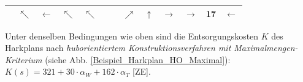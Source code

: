 \begin{center}
\begin{minipage}{\textwidth}
\begin{table}[H]
\begin{scriptsize}
\begin{tabular}{|>{}c|>{}c|>{}c|>{}c|>{}c|>{}c|>{}c|>{}c|>{}c|>{}c|>{}c|>{}c|>{}c|}
\hline
\cellcolor{gray!50!white} &$\nwarrow$&$\leftarrow$&\cellcolor{blue!15!white}$\nwarrow$&
\cellcolor{yellow!15!white}$\nwarrow$&\cellcolor{gray!50!white} &\cellcolor{gray!50!white} &\cellcolor{red!15!white}$\nearrow$&\cellcolor{red!15!white}$\uparrow$& \cellcolor{green!15!white}$\rightarrow$&\cellcolor{green!15!white}$\rightarrow$&\cellcolor{green!15!white}\bf{17}&\cellcolor{green!15!white}$\leftarrow$ \\
\hline
\end{tabular}
\label{Beispiel_Harkplan_HO_Minimal_}
\end{scriptsize} 
\end{table}
\renewcommand{\arraystretch}{1}
\end{minipage}
\end{center}

\noindent Unter denselben Bedingungen wie oben sind die Entsorgungskosten $K$ des Harkplans nach \textit{huborientiertem Konstruktionsverfahren mit Maximalmengen-Kriterium} (siehe Abb. \ref{Beispiel_Harkplan_HO_Maximal}): $K(s) = 321 + 30 \cdot \alpha_W + 162 \cdot \alpha_T$ [ZE].


